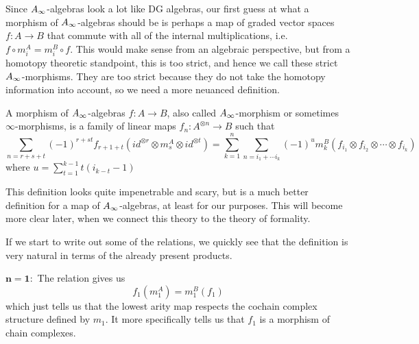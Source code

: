 
Since $\A$-algebras look a lot like DG algebras, our first guess at what a morphism of $\A$-algebras should be is perhaps a map of graded vector spaces $f:A\longrightarrow B$ that commute with all of the internal multiplications, i.e. $f\circ m^A_i = m^B_i\circ f$. This would make sense from an algebraic perspective, but from a homotopy theoretic standpoint, this is too strict, and hence we call these strict $\A$-morphisms. They are too strict because they do not take the homotopy information into account, so we need a more neuanced definition. 

\begin{definition}[$\A$-morphism]
A morphism of $\A$-algebras $f:A\rightarrow B$, also called $\A$-morphism or sometimes $\infty$-morphisms, is a family of linear maps $f_n:A^{\otimes n}\rightarrow B$ such that 
\begin{equation*}
    \sum_{n = r+s+t}(-1)^{r+st}f_{r+1+t}(id^{\otimes r}\otimes m_s^A \otimes id^{\otimes t}) = \sum_{k=1}^{n}\sum_{n=i_1+\cdots i_k}(-1)^{u} m_k^B(f_{i_1}\otimes f_{i_2}\otimes \cdots \otimes f_{i_k})
\end{equation*}
where $u=\displaystyle \sum_{t=1}^{k-1}t(i_{k-t}-1)$
\end{definition}

This definition looks quite impenetrable and scary, but is a much better definition for a map of $\A$-algebras, at least for our purposes. This will become more clear later, when we connect this theory to the theory of formality.  

If we start to write out some of the relations, we quickly see that the definition is very natural in terms of the already present products.

$\mathbf{n=1 :}$ The relation gives us
\begin{equation*}
    f_1(m_1^A) = m_1^B(f_1)
\end{equation*}
which just tells us that the lowest arity map respects the cochain complex structure defined by $m_1$. It more specifically tells us that $f_1$ is a morphism of chain complexes. 

